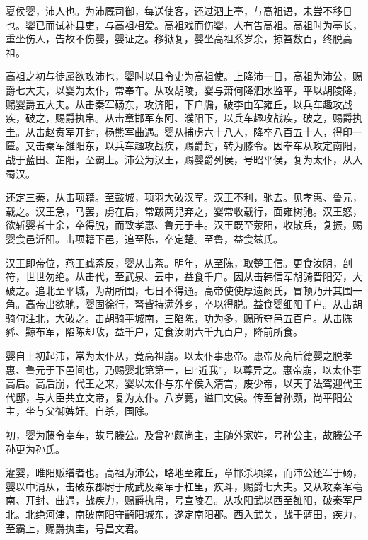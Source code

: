 \documentclass[12pt,UTF8]{ctexbook}
\begin{document}
夏侯婴，沛人也。为沛厩司御，每送使客，还过泗上亭，与高祖语，未尝不移日也。婴已而试补县吏，与高祖相爱。高祖戏而伤婴，人有告高祖。高祖时为亭长，重坐伤人，告故不伤婴，婴证之。移狱复，婴坐高祖系岁余，掠笞数百，终脱高祖。



高祖之初与徒属欲攻沛也，婴时以县令史为高祖使。上降沛一日，高祖为沛公，赐爵七大夫，以婴为太仆，常奉车。从攻胡陵，婴与萧何降泗水监平，平以胡陵降，赐婴爵五大夫。从击秦军砀东，攻济阳，下户牖，破李由军雍丘，以兵车趣攻战疾，破之，赐爵执帛。从击章邯军东阿、濮阳下，以兵车趣攻战疾，破之，赐爵执圭。从击赵贲军开封，杨熊军曲遇。婴从捕虏六十八人，降卒八百五十人，得印一匮。又击秦军雒阳东，以兵车趣攻战疾，赐爵封，转为膝令。因奉车从攻定南阳，战于蓝田、芷阳，至霸上。沛公为汉王，赐婴爵列侯，号昭平侯，复为太仆，从入蜀汉。



还定三秦，从击项籍。至鼓城，项羽大破汉军。汉王不利，驰去。见孝惠、鲁元，载之。汉王急，马罢，虏在后，常跋两兒弃之，婴常收载行，面雍树驰。汉王怒，欲斩婴者十余，卒得脱，而致孝惠、鲁元于丰。汉王既至荥阳，收散兵，复振，赐婴食邑沂阳。击项籍下邑，追至陈，卒定楚。至鲁，益食兹氏。



汉王即帝位，燕王臧荼反，婴从击荼。明年，从至陈，取楚王信。更食汝阴，剖符，世世勿绝。从击代，至武泉、云中，益食千户。因从击韩信军胡骑晋阳旁，大破之。追北至平城，为胡所围，七日不得通。高帝使使厚遗阏氏，冒顿乃开其围一角。高帝出欲驰，婴固徐行，弩皆持满外乡，卒以得脱。益食婴细阳千户。从击胡骑句注北，大破之。击胡骑平城南，三陷陈，功为多，赐所夺邑五百户。从击陈豨、黥布军，陷陈却敌，益千户，定食汝阴六千九百户，降前所食。



婴自上初起沛，常为太仆从，竟高祖崩。以太仆事惠帝。惠帝及高后德婴之脱孝惠、鲁元于下邑间也，乃赐婴北第第一，曰“近我”，以尊异之。惠帝崩，以太仆事高后。高后崩，代王之来，婴以太仆与东牟侯入清宫，废少帝，以天子法驾迎代王代邸，与大臣共立文帝，复为太仆。八岁薨，谥曰文侯。传至曾孙颇，尚平阳公主，坐与父御婢奸。自杀，国除。



初，婴为藤令奉车，故号滕公。及曾孙颇尚主，主随外家姓，号孙公主，故滕公子孙更为孙氏。



灌婴，睢阳贩缯者也。高祖为沛公，略地至雍丘，章邯杀项梁，而沛公还军于砀，婴以中涓从，击破东郡尉于成武及秦军于杠里，疾斗，赐爵七大夫。又从攻秦军亳南、开封、曲遇，战疾力，赐爵执帛，号宣陵君。从攻阳武以西至雒阳，破秦军尸北。北绝河津，南破南阳守齮阳城东，遂定南阳郡。西入武关，战于蓝田，疾力，至霸上，赐爵执圭，号昌文君。
\end{document}
